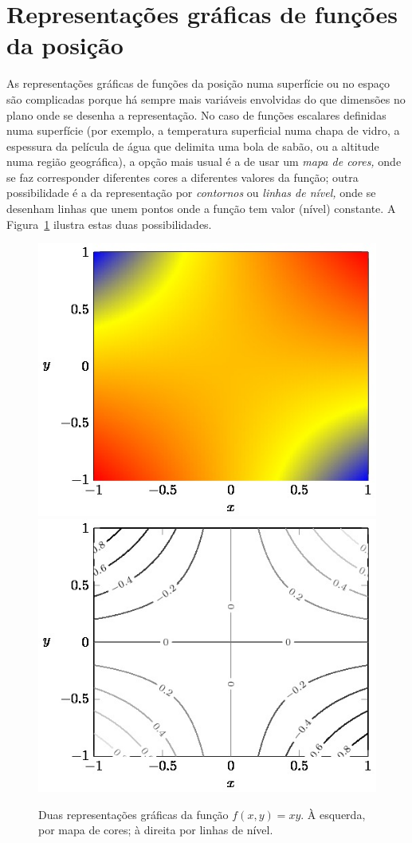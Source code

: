 \section{Representações gráficas de funções da posição}
\label{sec:surfgraf}
As representações gráficas de funções da posição numa superfície ou no espaço
são complicadas porque há sempre mais variáveis envolvidas do que dimensões no
plano onde se desenha a representação. No caso de funções escalares definidas
numa superfície (por exemplo, a temperatura superficial numa chapa de vidro, a
espessura da película de água que delimita uma bola de sabão, ou a altitude numa
região geográfica), a opção mais usual é a de usar um \emph{mapa de cores,} onde
se faz corresponder diferentes cores a diferentes valores da função; outra
possibilidade é a da representação por \emph{contornos} ou \emph{linhas de
nível,} onde se desenham linhas que unem pontos onde a função tem valor (nível)
constante. A Figura~\ref{fig:plot2d} ilustra estas duas possibilidades.
\begin{figure}[htb]
{\centering
\includegraphics[width=0.4\linewidth]{figs/f10-plot2d-surf}\hspace{5mm}
\includegraphics[width=0.4\linewidth]{figs/f10-plot2d-cont}\hspace{5mm}
\par
}
\caption{Duas representações gráficas da função $f(x,y)=xy$. À esquerda, por
mapa de cores; à direita por linhas de nível.\label{fig:plot2d}}
\end{figure}

